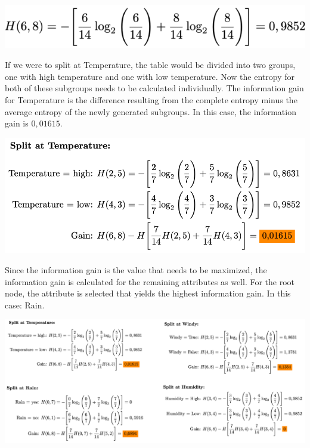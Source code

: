\documentclass[
12pt,
headsepline,
bibliography=totoc,
twoside=semi,
fleqn
]{scrartcl}
\begin{document}
 \begin{center}\includegraphics[scale=0.7]{BDT8.png}\label{fig:fig8}\end{center}

 If we were to split at Temperature, the table would be divided into two groups, one with high temperature and one with low temperature. Now the entropy for both of these subgroups needs to be calculated individually. The information gain for Temperature is the difference resulting from the complete entropy minus the average entropy of the newly generated subgroups. In this case, the information gain is $0,01615$. 

 \begin{center}\includegraphics[scale=0.7]{BDT7.png}\label{fig:fig7}\end{center}

 Since the information gain is the value that needs to be maximized, the information gain is calculated for the remaining attributes as well. For the root node, the attribute is selected that yields the highest information gain. In this case: Rain. 

\includegraphics[scale=0.7]{BDT9.png}\label{fig:fig9}\\%
\end{document}
